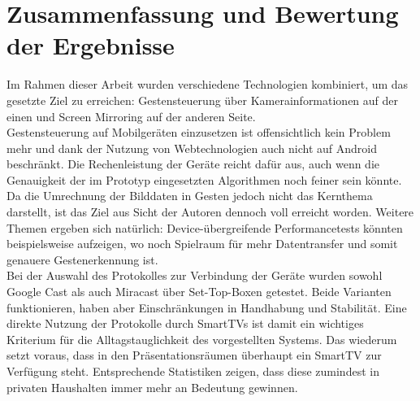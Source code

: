 \documentclass{article}
\begin{document}
\section{Zusammenfassung und Bewertung der Ergebnisse}
Im Rahmen dieser Arbeit wurden verschiedene Technologien kombiniert, um das gesetzte Ziel zu erreichen: Gestensteuerung über Kamerainformationen auf der einen und Screen Mirroring auf der anderen Seite.\\
Gestensteuerung auf Mobilgeräten einzusetzen ist offensichtlich kein Problem mehr und dank der Nutzung von Webtechnologien auch nicht auf Android beschränkt. Die Rechenleistung der Geräte reicht dafür aus, auch wenn die Genauigkeit der im Prototyp eingesetzten Algorithmen noch feiner sein könnte. Da die Umrechnung der Bilddaten in Gesten jedoch nicht das Kernthema darstellt, ist das Ziel aus Sicht der Autoren dennoch voll erreicht worden. Weitere Themen ergeben sich natürlich: Device-übergreifende Performancetests könnten beispielsweise aufzeigen, wo noch Spielraum für mehr Datentransfer und somit genauere Gestenerkennung ist. \\
Bei der Auswahl des Protokolles zur Verbindung der Geräte wurden sowohl Google Cast als auch Miracast über Set-Top-Boxen getestet. Beide Varianten funktionieren, haben aber Einschränkungen in Handhabung und Stabilität. Eine direkte Nutzung der Protokolle durch SmartTVs ist damit ein wichtiges Kriterium für die Alltagstauglichkeit des vorgestellten Systems. Das wiederum setzt voraus, dass in den Präsentationsräumen überhaupt ein SmartTV zur Verfügung steht. Entsprechende Statistiken\cite{statistatv} zeigen, dass diese zumindest in privaten Haushalten immer mehr an Bedeutung gewinnen.



%



\end{document}
